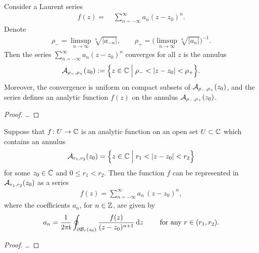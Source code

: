 \begin{lemma}
  \label{lem:laurent_series_analytic}
  Consider a Laurent series
  \begin{align*}
    f(z) = & \; \sum_{n=-\infty}^\infty a_n (z - z_0)^n .
  \end{align*}
  Denote
  \begin{align*}
    \rho_- = \limsup_{n \to \infty} \sqrt[n]{|a_{-n}|}, \qquad
    \rho_+ = \Big( \limsup_{n \to \infty} \sqrt[n]{|a_{n}|} \Big)^{-1} .
  \end{align*}
  Then the series $\sum_{n=-\infty}^\infty a_n (z - z_0)^n$
  converges for all $z$ is the annulus
  \begin{align*}
    \mathcal{A}_{\rho_-,\rho_+}(z_0)
      := \Big\{ z \in \mathbb{C} \; \Big| \; \rho_- < |z-z_0| < \rho_+ \Big\} .
  \end{align*}
  Moreover, the convergence is uniform on compact subsets
  of $\mathcal{A}_{\rho_-,\rho_+}(z_0)$, and the series defines an analytic
  function $f(z)$ on the annulus $\mathcal{A}_{\rho_-,\rho_+}(z_0)$.
\end{lemma}
\begin{proof}
  \ldots
\end{proof}

\begin{theorem}
  \label{thm:analytic_function_laurent_series}
  Suppose that $f \colon U \to \mathbb{C}$ is an analytic function
  on an open set $U \subset \mathbb{C}$ which contains
  an annulus
  \begin{align*}
    \mathcal{A}_{r_1,r_2}(z_0) = \Big\{z \in \mathbb{C} \; \Big| \; r_1 < |z - z_0| < r_2 \Big\}
  \end{align*}
  for some $z_0 \in \mathbb{C}$ and $0 \le r_1 < r_2$.
  Then the function $f$ can be represented in $\mathcal{A}_{r_1,r_2}(z_0)$
  as a series
  \begin{align*}
    f(z) = \sum_{n=-\infty}^\infty a_n \, (z-z_0)^n ,
  \end{align*}
  where the coefficients $a_n$, for $n \in \mathbb{Z}$, are given by
  \begin{align*}
    a_n = \frac{1}{2\pi \mathfrak{i}}
      \oint_{\partial \mathcal{B}_{r}(z_0)} \frac{f(z)}{(z - z_0)^{n+1}} \, \mathrm{d} z
    \qquad \text{ for any } r \in (r_1, r_2) .
  \end{align*}
\end{theorem}
\begin{proof}
  \ldots
\end{proof}
